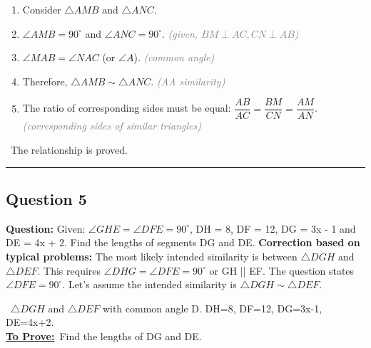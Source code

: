 \documentclass{article}
\newenvironment{steps}{%
  \begin{enumerate}[label=\textcolor{primary}{Step~\arabic*:}, leftmargin=*]
}{\end{enumerate}}
\newcommand{\sul}[1]{\uline{#1}}
\newcommand{\dul}[1]{\uuline{#1}}
\newcommand{\solutionheading}{{\raggedright\dul{\textbf{Solution}}\par}}
\newcommand{\given}[1]{\noindent\textbf{\textcolor{secondary}{\dul{Given:}}}~#1\\}
\newcommand{\toprove}[1]{\noindent\textbf{\textcolor{primary}{\sul{To Prove:}}}~#1\\}
\newcommand{\reason}[1]{\hfill\textit{\textcolor{gray}{(#1)}}}
\newcommand{\solutionrule}{\par\noindent\color{accent}\rule{\linewidth}{0.6pt}\par\smallskip}
\newcommand{\finalanswer}[1]{\noindent\textbf{\textcolor{accent}{\dul{Answer:}}}~#1\solutionrule}
\begin{document}
\begin{center}
\end{center}

\begin{steps}
    \item Consider $\triangle AMB$ and $\triangle ANC$.
    \item $\angle AMB = 90^\circ$ and $\angle ANC = 90^\circ$. \reason{given, $BM \perp AC, CN \perp AB$}
    \item $\angle MAB = \angle NAC$ (or $\angle A$). \reason{common angle}
    \item Therefore, $\triangle AMB \sim \triangle ANC$. \reason{AA similarity}
    \item The ratio of corresponding sides must be equal: $\dfrac{AB}{AC} = \dfrac{BM}{CN} = \dfrac{AM}{AN}$. \reason{corresponding sides of similar triangles}
\end{steps}

\finalanswer{The relationship is proved.}

\subsection*{Question 5}
\textbf{Question:} Given: $\angle GHE = \angle DFE = 90^\circ$, DH = 8, DF = 12, DG = 3x - 1 and DE = 4x + 2. Find the lengths of segments DG and DE.
\textbf{Correction based on typical problems:} The most likely intended similarity is between $\triangle DGH$ and $\triangle DEF$. This requires $\angle DHG = \angle DFE = 90^\circ$ or GH || EF. The question states $\angle DFE = 90^\circ$. Let's assume the intended similarity is $\triangle DGH \sim \triangle DEF$.

\solutionheading
\given{$\triangle DGH$ and $\triangle DEF$ with common angle D. DH=8, DF=12, DG=3x-1, DE=4x+2.}
\toprove{Find the lengths of DG and DE.}
\end{document}
